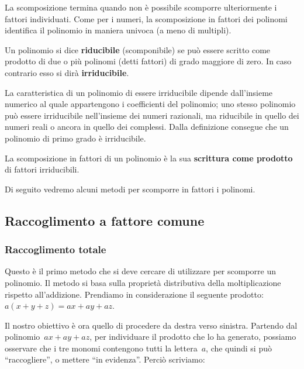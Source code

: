 La scomposizione termina quando non è possibile scomporre ulteriormente i 
fattori individuati.
Come per i numeri, la scomposizione in fattori dei polinomi identifica il 
polinomio in maniera univoca (a meno di multipli).

\begin{definizione}{}{}
Un polinomio si dice \textbf{riducibile} (scomponibile) se può essere
scritto come prodotto di due o più polinomi (detti fattori) di grado 
maggiore di zero.
In caso contrario esso si dirà \textbf{irriducibile}.
\end{definizione}

La caratteristica di un polinomio di essere irriducibile dipende 
dall'insieme 
numerico al quale appartengono i coefficienti del polinomio;
uno stesso polinomio può essere irriducibile nell'insieme dei numeri 
razionali, ma riducibile in quello dei numeri reali o ancora in quello dei 
complessi.
Dalla definizione consegue che un polinomio di primo grado è irriducibile.

\begin{definizione}{}{}
La scomposizione in fattori di un polinomio è la sua \textbf{scrittura come prodotto} di fattori irriducibili.
\end{definizione}

Di seguito vedremo alcuni metodi per scomporre in fattori i polinomi.


\subsection{Raccoglimento a fattore comune}
\label{subsec:divpol_fattorecomune}

\subsubsection{Raccoglimento totale}

Questo è il primo metodo che si deve cercare di utilizzare per scomporre un 
polinomio.
Il metodo si basa sulla proprietà distributiva della moltiplicazione 
rispetto all'addizione.
Prendiamo in considerazione il seguente prodotto:~\(a(x+y+z)=ax+ay+az\).

Il nostro obiettivo è ora quello di procedere da destra verso sinistra. 
Partendo dal polinomio~\(ax+ay+az\), per individuare il 
prodotto che lo ha generato, possiamo osservare che i tre monomi 
contengono tutti la lettera~\(a\), che quindi si può ``raccogliere'',
o mettere ``in evidenza''. Perciò scriviamo: 

